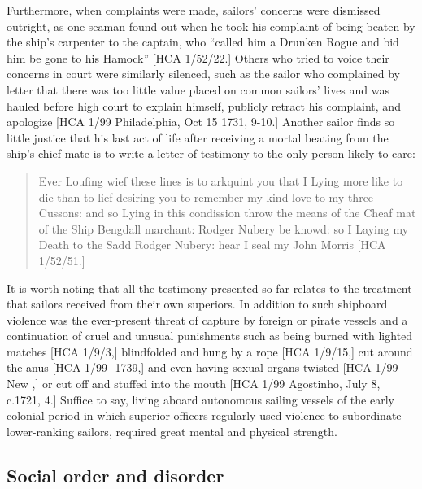 Furthermore, when complaints were made, sailors’ concerns were dismissed outright, as one seaman found out when he took his complaint of being beaten by the ship’s carpenter to the captain, who “called him a Drunken Rogue and bid him be gone to his Hamock” [HCA 1/52/22.] Others who tried to voice their concerns in court were similarly silenced, such as the sailor who complained by letter that there was too little value placed on common sailors’ lives and was hauled before high court to explain himself, publicly retract his complaint, and apologize [HCA 1/99 Philadelphia, Oct 15 1731, 9-10.] Another sailor finds so little justice that his last act of life after receiving a mortal beating from the ship’s chief mate is to write a letter of testimony to the only person likely to care:

\begin{quotation}
Ever Loufing wief these lines is to arkquint you that I Lying more like to die than to lief desiring you to remember my kind love to my three Cussons: and so Lying in this condission throw the means of the Cheaf mat of the Ship Bengdall marchant: Rodger Nubery be knowd: so I Laying my Death to the Sadd Rodger Nubery: hear I seal my John Morris [HCA 1/52/51.] \end{quotation}

It is worth noting that all the testimony presented so far relates to the treatment that sailors received from their own superiors. In addition to such shipboard violence was the ever-present threat of capture by foreign or pirate vessels and a continuation of cruel and unusual punishments such as being burned with lighted matches [HCA 1/9/3,] blindfolded and hung by a rope [HCA 1/9/15,] cut around the anus [HCA 1/99 \citealt{Jamaica1738}-1739,] and even having sexual organs twisted [HCA 1/99 New \citealt{Providence1722},] or cut off and stuffed into the mouth [HCA 1/99 Agostinho, July 8, c.1721, 4.] Suffice to say, living aboard autonomous sailing vessels of the early colonial period in which superior officers regularly used violence to subordinate lower-ranking sailors, required great mental and physical strength.

\subsection{{Social} {order} {and} {disorder}}%

